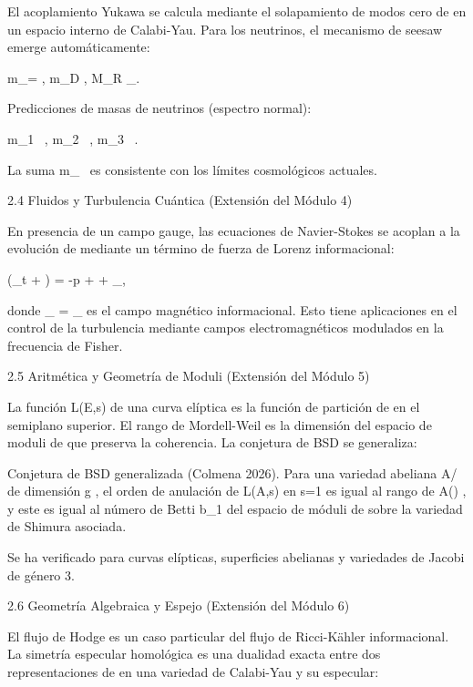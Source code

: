 \documentclass[12pt,a4paper]{book}
\begin{document}
El acoplamiento Yukawa se calcula mediante el solapamiento de modos cero de  \rho  en un espacio interno de Calabi-Yau. Para los neutrinos, el mecanismo de seesaw emerge automáticamente:

m_\nu = , \quad m_D \propto \langle \rho \rangle, \quad M_R \propto \Lambda_{}.

Predicciones de masas de neutrinos (espectro normal):

m_1 \ , \quad m_2 \ , \quad m_3 \ .

La suma  \sum m_\nu {}\   es consistente con los límites cosmológicos actuales.

2.4 Fluidos y Turbulencia Cuántica (Extensión del Módulo 4)

En presencia de un campo gauge, las ecuaciones de Navier-Stokes se acoplan a la evolución de  \rho  mediante un término de fuerza de Lorenz informacional:

\rho (\partial_t  + \cdot\nabla{}) = -\nabla p + \nu \Delta {} +  \times {}_{},

donde  _{} = \nabla \times {}_{}  es el campo magnético informacional. Esto tiene aplicaciones en el control de la turbulencia mediante campos electromagnéticos modulados en la frecuencia de Fisher.

2.5 Aritmética y Geometría de Moduli (Extensión del Módulo 5)

La función  L(E,s)  de una curva elíptica es la función de partición de  \rho  en el semiplano superior. El rango de Mordell-Weil es la dimensión del espacio de moduli de  \rho  que preserva la coherencia. La conjetura de BSD se generaliza:

Conjetura de BSD generalizada (Colmena 2026). Para una variedad abeliana  A/  de dimensión  g , el orden de anulación de  L(A,s)  en  s=1  es igual al rango de  A() , y este es igual al número de Betti  b_1  del espacio de móduli de  \rho  sobre la variedad de Shimura asociada.

Se ha verificado para curvas elípticas, superficies abelianas y variedades de Jacobi de género 3.

2.6 Geometría Algebraica y Espejo (Extensión del Módulo 6)

El flujo de Hodge es un caso particular del flujo de Ricci-Kähler informacional. La simetría especular homológica es una dualidad exacta entre dos representaciones de  \rho  en una variedad de Calabi-Yau y su especular:
\end{document}
